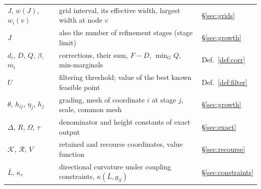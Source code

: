 \begin{table}[htbp]
\begin{tabular}{@{}lll@{}}
$J$, $w(J)$, $w_i(v)$ & grid interval, its effective width, largest width at node $v$ & \S\ref{sec:grids}\\
$J$ & also the number of refinement stages (stage limit) & \S\ref{sec:growth}\\
$d_i$, $D$, $Q$, $\beta$, $m_i$ & corrections, their sum, $F-D$, $\min_GQ$, min-marginals & Def.~\ref{def:corr}\\
$U$ & filtering threshold; value of the best known feasible point & Def.~\ref{def:filter}\\
$\theta$, $h_{ij}$, $\eta_j$, $h_j$ & grading, mesh of coordinate $i$ at stage $j$, scale, common mesh & \S\ref{sec:growth}\\
$\Delta$, $R$, $\Omega$, $\tau$ & denominator and height constants of exact output & \S\ref{sec:exact}\\
$\mathcal K$, $\mathcal R$, $V$ & retained and recourse coordinates, value function & \S\ref{sec:recourse}\\
$\bar L$, $\kappa_c$ & directional curvature under coupling constraints, $\kappa(\bar L,g_S)$ & \S\ref{sec:constraints}\\
\bottomrule
\end{tabular}
\end{table}
